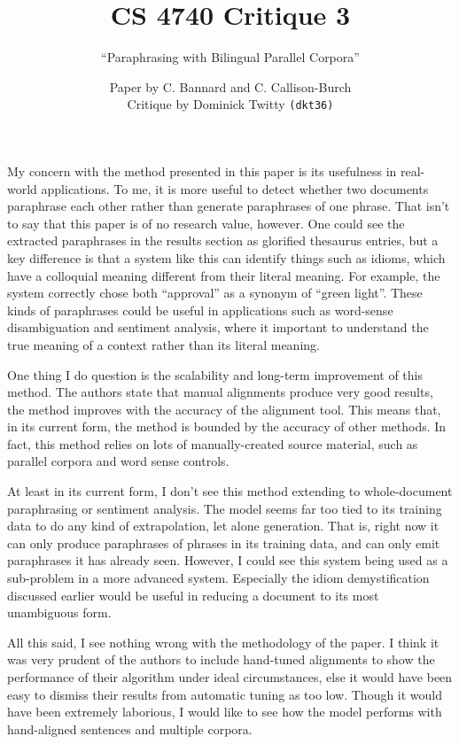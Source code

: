 \documentclass[12pt]{scrartcl}
\begin{document}
\title{CS 4740 Critique 3}
\subtitle{``Paraphrasing with Bilingual Parallel Corpora''}
\author{Paper by C. Bannard and C. Callison-Burch \\
Critique by Dominick Twitty \texttt{(dkt36)}}
\date{}
\maketitle

My concern with the method presented in this paper is its usefulness in real-world applications. To me, it is more useful to detect whether two documents paraphrase each other rather than generate paraphrases of one phrase. That isn't to say that this paper is of no research value, however. One could see the extracted paraphrases in the results section as glorified thesaurus entries, but a key difference is that a system like this can identify things such as idioms, which have a colloquial meaning different from their literal meaning. For example, the system correctly chose both ``approval'' as a synonym of ``green light''. These kinds of paraphrases could be useful in applications such as word-sense disambiguation and sentiment analysis, where it important to understand the true meaning of a context rather than its literal meaning.

One thing I do question is the scalability and long-term improvement of this method. The authors state that manual alignments produce very good results, the method improves with the accuracy of the alignment tool. This means that, in its current form, the method is bounded by the accuracy of other methods. In fact, this method relies on lots of manually-created source material, such as parallel corpora and word sense controls. 

At least in its current form, I don't see this method extending to whole-document paraphrasing or sentiment analysis. The model seems far too tied to its training data to do any kind of extrapolation, let alone generation. That is, right now it can only produce paraphrases of phrases in its training data, and can only emit paraphrases it has already seen. However, I could see this system being used as a sub-problem in a more advanced system. Especially the idiom demystification discussed earlier would be useful in reducing a document to its most unambiguous form.

All this said, I see nothing wrong with the methodology of the paper. I think it was very prudent of the authors to include hand-tuned alignments to show the performance of their algorithm under ideal circumstances, else it would have been easy to dismiss their results from automatic tuning as too low. Though it would have been extremely laborious, I would like to see how the model performs with hand-aligned sentences and multiple corpora.
\end{document}
